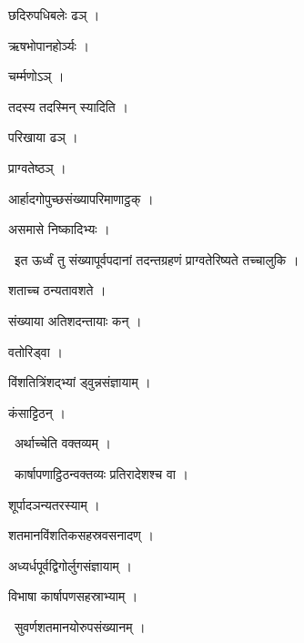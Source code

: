 \documentclass[10pt, openany, oneside]{book}
\begin{document}
\noindent छदिरुपधिबलेः ढञ् ।

\noindent ऋषभोपानहोर्ञ्यः ।

\noindent चर्म्मणोऽञ् ।

\noindent तदस्य तदस्मिन् स्यादिति ।

\noindent परिखाया ढञ् ।

\noindent प्राग्वतेष्ठञ् ।

\noindent आर्हादगोपुच्छसंख्यापरिमाणाट्ठक् ।

\noindent असमासे निष्कादिभ्यः ।

\par\noindent\hspace{1.5em}{\vps वा॰}~{\qt इत ऊर्ध्वं तु संख्यापूर्वपदानां तदन्तग्रहणं प्राग्वतेरिष्यते तच्चालुकि ।}

\noindent शताच्च ठन्यतावशते ।

\noindent संख्याया अतिशदन्तायाः कन् ।

\noindent वतोरिड्वा ।

\noindent विंशतित्रिंशद्भ्यां ड्वुन्नसंज्ञायाम् ।

\noindent कंसाट्टिठन् ।

\par\noindent\hspace{1.5em}{\vps वा॰}~{\qt अर्थाच्चेति वक्तव्यम् ।}

\par\noindent\hspace{1.5em}{\vps वा॰}~{\qt कार्षापणाट्ठिठन्वक्तव्यः प्रतिरादेशश्च वा ।}

\noindent शूर्पादञन्यतरस्याम् ।

\noindent शतमानविंशतिकसहस्रवसनादण् ।

\noindent अध्यर्धपूर्वद्विगोर्लुगसंज्ञायाम् ।

\noindent विभाषा कार्षापणसहस्राभ्याम् ।

\par\noindent\hspace{1.5em}{\vps वा॰}~{\qt सुवर्णशतमानयोरुपसंख्यानम् ।}
\end{document}
